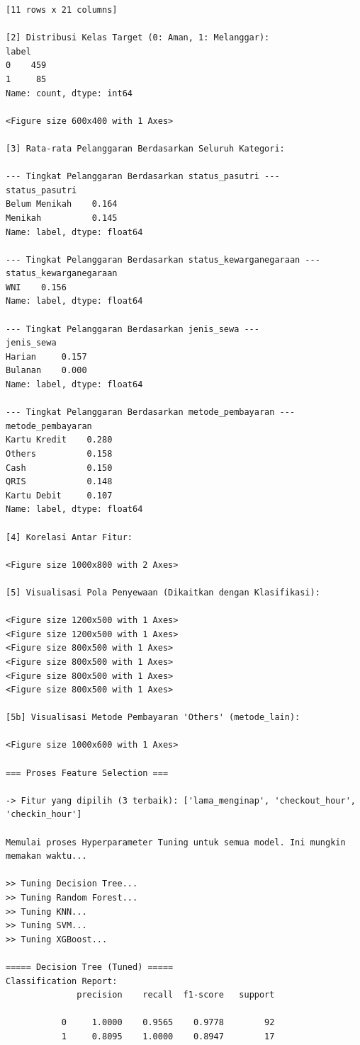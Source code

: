 \begin{lstlisting}[caption={Output 21}]
[11 rows x 21 columns]

[2] Distribusi Kelas Target (0: Aman, 1: Melanggar):
label
0    459
1     85
Name: count, dtype: int64

<Figure size 600x400 with 1 Axes>

[3] Rata-rata Pelanggaran Berdasarkan Seluruh Kategori:

--- Tingkat Pelanggaran Berdasarkan status_pasutri ---
status_pasutri
Belum Menikah    0.164
Menikah          0.145
Name: label, dtype: float64

--- Tingkat Pelanggaran Berdasarkan status_kewarganegaraan ---
status_kewarganegaraan
WNI    0.156
Name: label, dtype: float64

--- Tingkat Pelanggaran Berdasarkan jenis_sewa ---
jenis_sewa
Harian     0.157
Bulanan    0.000
Name: label, dtype: float64

--- Tingkat Pelanggaran Berdasarkan metode_pembayaran ---
metode_pembayaran
Kartu Kredit    0.280
Others          0.158
Cash            0.150
QRIS            0.148
Kartu Debit     0.107
Name: label, dtype: float64

[4] Korelasi Antar Fitur:

<Figure size 1000x800 with 2 Axes>

[5] Visualisasi Pola Penyewaan (Dikaitkan dengan Klasifikasi):

<Figure size 1200x500 with 1 Axes>
<Figure size 1200x500 with 1 Axes>
<Figure size 800x500 with 1 Axes>
<Figure size 800x500 with 1 Axes>
<Figure size 800x500 with 1 Axes>
<Figure size 800x500 with 1 Axes>

[5b] Visualisasi Metode Pembayaran 'Others' (metode_lain):

<Figure size 1000x600 with 1 Axes>

=== Proses Feature Selection ===

-> Fitur yang dipilih (3 terbaik): ['lama_menginap', 'checkout_hour', 'checkin_hour']

Memulai proses Hyperparameter Tuning untuk semua model. Ini mungkin memakan waktu...

>> Tuning Decision Tree...
>> Tuning Random Forest...
>> Tuning KNN...
>> Tuning SVM...
>> Tuning XGBoost...

===== Decision Tree (Tuned) =====
Classification Report:
              precision    recall  f1-score   support

           0     1.0000    0.9565    0.9778        92
           1     0.8095    1.0000    0.8947        17


\end{lstlisting}
